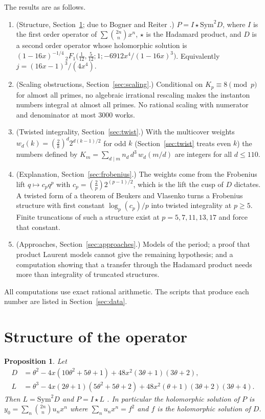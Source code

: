 \documentclass[11pt]{amsart}
\newtheorem{proposition}[theorem]{Proposition}
\theoremstyle{definition}
\theoremstyle{remark}
\newcommand{\leg}[2]{\left(\frac{#1}{#2}\right)}
\begin{document}
The results are as follows.

\begin{enumerate}
\item (Structure, Section~\ref{sec:structure}; due to Bogner and Reiter \cite{BR}.) $P=I\star\mathrm{Sym}^2 D$, where $I$ is the first order
operator of $\sum\binom{2n}{n}x^n$, $\star$ is the Hadamard product, and $D$ is a second order
operator whose holomorphic solution is
$(1-16x)^{-1/4}\,{}_2F_1\bigl(\tfrac1{12},\tfrac5{12};1;-6912x^4/(1-16x)^3\bigr)$. Equivalently
$j=(16x-1)^3/(4x^4)$.
\item (Scaling obstructions, Section~\ref{sec:scaling}.) Conditional on $K_p\equiv8\pmod p$ for almost all primes, no algebraic irrational rescaling makes the instanton numbers integral at almost all primes. No rational scaling with numerator and denominator at most $3000$ works.
\item (Twisted integrality, Section~\ref{sec:twist}.) With the multicover weights
$w_d(k)=\leg{2}{k}^d 2^{d(k-1)/2}$ for odd $k$ (Section~\ref{sec:twist} treats even $k$) the numbers
defined by
$K_m=\sum_{d\mid m} n_d\,d^3\,w_d(m/d)$ are integers for all $d\le110$.
\item (Explanation, Section~\ref{sec:frobenius}.) The weights come from the Frobenius lift
$q\mapsto c_pq^p$ with $c_p=\leg2p 2^{(p-1)/2}$, which is the lift the cusp of $D$ dictates.
A twisted form of a theorem of Beukers and Vlasenko \cite{BV} turns a Frobenius structure with first
constant $\log_p(c_p)/p$ into twisted integrality at $p\ge5$. Finite truncations of such a
structure exist at $p=5,7,11,13,17$ and force that constant.
\item (Approaches, Section~\ref{sec:approaches}.) Models of the period; a proof that product
Laurent models cannot give the remaining hypothesis; and a computation showing that a transfer
through the Hadamard product needs more than integrality of truncated structures.
\end{enumerate}

All computations use exact rational arithmetic. The scripts that produce each number are listed in
Section~\ref{sec:data}.

\section{Structure of the operator}\label{sec:structure}

\begin{proposition}\label{prop:structure}
Let
\begin{align*}
D&=\theta^2-4x(10\theta^2+5\theta+1)+48x^2(3\theta+1)(3\theta+2),\\
L&=\theta^3-4x(2\theta+1)(5\theta^2+5\theta+2)+48x^2(\theta+1)(3\theta+2)(3\theta+4).
\end{align*}
Then $L=\mathrm{Sym}^2 D$ and $P=I\star L$ \cite[Proposition~3.6, entry $8'$]{BR}. In particular the holomorphic solution of $P$ is
$y_0=\sum_n\binom{2n}{n}u_nx^n$ where $\sum_n u_nx^n=f^2$ and $f$ is the holomorphic solution of $D$.
\end{proposition}
\end{document}
